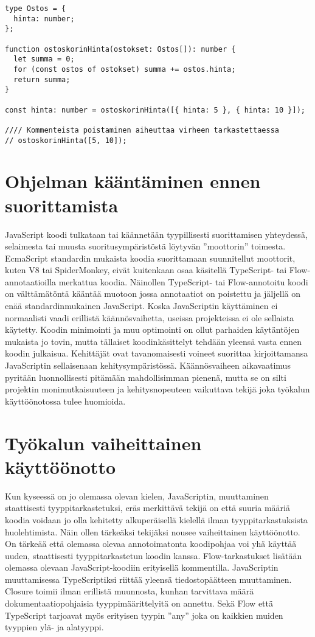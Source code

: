 \begin{minipage}{\linewidth}
\begin{lstlisting}[caption={Esimerkki Flow tai TypeScript annotaatiosta funktiolle},label={lst:ostoskorin_hinta_flow}]
type Ostos = {
  hinta: number;
};

function ostoskorinHinta(ostokset: Ostos[]): number {
  let summa = 0;
  for (const ostos of ostokset) summa += ostos.hinta;
  return summa;
}

const hinta: number = ostoskorinHinta([{ hinta: 5 }, { hinta: 10 }]);

//// Kommenteista poistaminen aiheuttaa virheen tarkastettaessa
// ostoskorinHinta([5, 10]);
\end{lstlisting}
\end{minipage}

\section{Ohjelman kääntäminen ennen suorittamista}

JavaScript koodi tulkataan tai käännetään tyypillisesti suorittamisen
yhteydessä, selaimesta tai muusta suoritusympäristöstä löytyvän ”moottorin”
toimesta. EcmaScript standardin mukaista koodia suorittamaan suunnitellut
moottorit, kuten V8 tai SpiderMonkey, eivät kuitenkaan osaa käsitellä
TypeScript- tai Flow-annotaatioilla merkattua koodia. Näinollen TypeScript-
tai Flow-annotoitu koodi on välttämätöntä kääntää muotoon jossa
annotaatiot on poistettu ja jäljellä on enää standardinmukainen JavaScript.
Koska JavaScriptin käyttäminen ei normaalisti vaadi erillistä
käännösvaihetta, useissa projekteissa ei ole sellaista käytetty. Koodin
minimointi ja muu optimointi on ollut parhaiden käytäntöjen mukaista jo
tovin, mutta tällaiset koodinkäsittelyt tehdään yleensä vasta ennen koodin
julkaisua. Kehittäjät ovat tavanomaisesti voineet suorittaa kirjoittamansa
JavaScriptin sellaisenaan kehitysympäristössä. Käännösvaiheen aikavaatimus
pyritään luonnollisesti pitämään mahdollisimman pienenä, mutta se on silti
projektin monimutkaisuuteen ja kehitysnopeuteen vaikuttava tekijä joka
työkalun käyttöönotossa tulee huomioida.

\section{Työkalun vaiheittainen käyttöönotto}

Kun kyseessä on jo olemassa olevan kielen, JavaScriptin, muuttaminen
staattisesti tyyppitarkastetuksi, eräs merkittävä tekijä on että suuria
määriä koodia voidaan jo olla kehitetty alkuperäisellä kielellä ilman
tyyppitarkastuksista huolehtimista. Näin ollen tärkeäksi tekijäksi nousee
vaiheittainen käyttöönotto. On tärkeää että olemassa olevaa annotoimatonta
koodipohjaa voi yhä käyttää uuden, staattisesti tyyppitarkastetun koodin
kanssa. Flow-tarkastukset lisätään olemassa olevaan JavaScript-koodiin
erityisellä kommentilla. JavaScriptin muuttamisessa TypeScriptiksi riittää
yleensä tiedostopäätteen muuttaminen. Closure toimii ilman erillistä
muunnosta, kunhan tarvittava määrä dokumentaatiopohjaisia tyyppimäärittelyitä
on annettu. Sekä Flow että TypeScript tarjoavat myös erityisen tyypin ”any”
joka on kaikkien muiden tyyppien ylä- ja alatyyppi.
